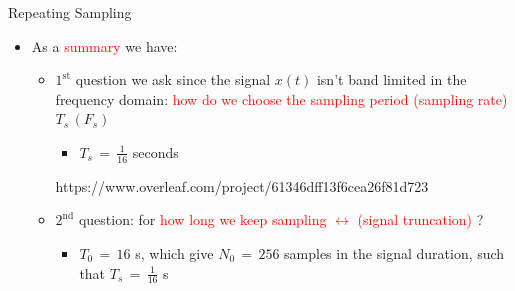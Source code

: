 \begin{frame}[t,allowframebreaks]{Repeating Sampling}
\begin{itemize}
\item As a \textcolor{red}{summary} we have:

\begin{itemize}

\item $\mathrm{1}^\mathrm{st}$ question we ask since the signal $x(t)$ isn't band limited in the frequency domain: \textcolor{red}{how do we choose the sampling period (sampling rate)} $T_s \, (F_s)$

	\begin{itemize}
	\item $T_s \, = \, \displaystyle\frac{1}{16}$ seconds
	\end{itemize}
https://www.overleaf.com/project/61346dff13f6cea26f81d723	
\item $\mathrm{2}^\mathrm{nd}$ question: for \textcolor{red}{how long we keep sampling $\leftrightarrow$ (signal truncation)} ?

	\begin{itemize}
	\item $T_0 \, = \, 16$ s, which give $N_0 \, = \, 256$ samples in the signal duration,
	such that $T_s \, = \, \displaystyle\frac{1}{16}$ s
	\end{itemize}

\end{itemize}


\end{itemize}


\end{frame}

